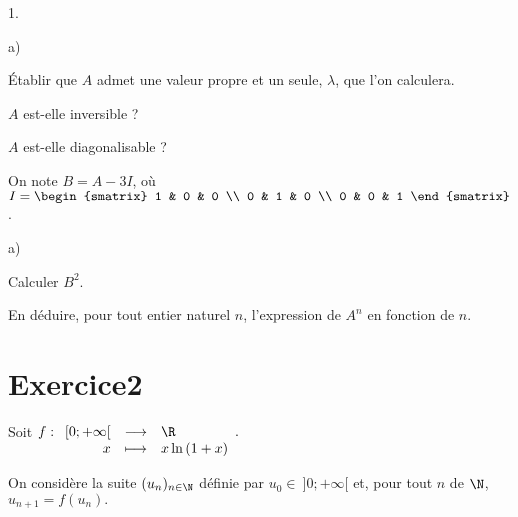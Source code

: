 \documentclass[11pt]{article}%
\begin{document}
\begin{noliste}{1.}
 \setlength{\itemsep}{4mm}
\item 
\begin{noliste}{a)}
 \setlength{\itemsep}{2mm}
\item Établir que $A$ admet une valeur propre et un seule, $\lambda $,
que l'on calculera.

\item $A$ est-elle inversible ?

\item $A$ est-elle diagonalisable ?
\end{noliste}

\item On note $B = A-3I$, où $I = 
\begin{smatrix}
1 & 0 & 0 \\
0 & 1 & 0 \\
0 & 0 & 1
\end{smatrix}
$.

\begin{noliste}{a)}
 \setlength{\itemsep}{2mm}
\item Calculer $B^{2}$.

\item En déduire, pour tout entier naturel $n$, l'expression de $A^{n}$
en fonction de $n$.
\end{noliste}
\end{noliste}

\section*{Exercice2}

Soit $f :\begin{array}[t]{rcl}
\lbrack 0; + \infty \lbrack & \longrightarrow & \R \\
x & \longmapsto & x\ln \,(1 + x)
\end{array}.$

On considère la suite $(u_{n})_{n\in \N}$ définie par $u_{0}\in \ ]0; +
\infty \lbrack $ et, pour tout $n$ de $\N$, $u_{n + 1} = f(u_{n}).$
\end{document}
